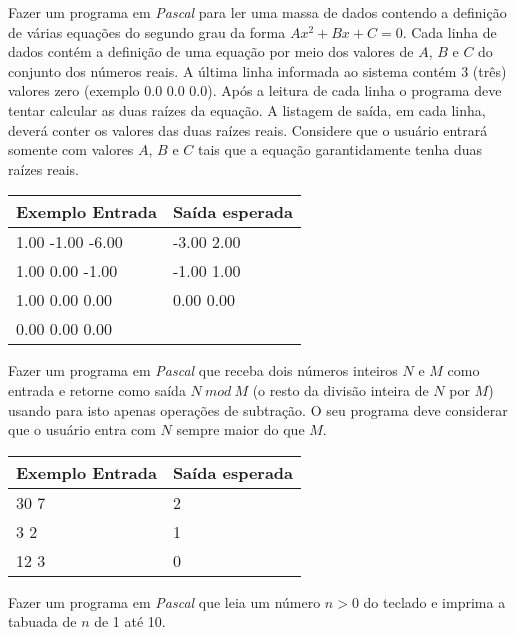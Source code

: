 \item Fazer um programa em \emph{Pascal} para
    ler  uma massa de  dados contendo a  definição de várias  equações do
    segundo grau da forma $Ax^{2} + Bx + C = 0$. Cada linha de dados contém a
    definição de uma equação por meio dos valores de $A$, $B$ e $C$ do conjunto
    dos  números reais.  A última  linha  informada ao  sistema contém  3
    (três) valores  zero (exemplo  0.0 0.0 0.0).  Após a leitura  de cada
    linha o  programa deve tentar calcular  as duas raízes  da equação. A
    listagem de saída, em cada  linha, deverá conter
    os valores das duas raízes reais. Considere
    que o usuário entrará somente com valores $A$, $B$ e $C$ tais que a equação
    garantidamente tenha duas raízes reais. 

\begin{center}
\begin{tabular}{|l|l|} \hline
Exemplo Entrada & Saída esperada \\ \hline
1.00 -1.00 -6.00 & -3.00 2.00 \\
1.00 0.00 -1.00  & -1.00 1.00 \\
1.00 0.00 0.00   & 0.00 0.00  \\ 
0.00 0.00 0.00   &            \\ \hline
\end{tabular}
\end{center}

\item Fazer um programa em \emph{Pascal} que receba dois números inteiros $N$ e
  $M$ como entrada e retorne como saída $N \ mod \ M$ (o resto da
  divisão inteira de $N$ por $M$) usando para isto apenas
  operações de subtração. O seu programa
  deve considerar que o usuário entra com $N$ sempre maior do que $M$.

\begin{center}
\begin{tabular}{|l|l|} \hline
Exemplo Entrada & Saída esperada \\ \hline
30 7            & 2              \\ \hline
3 2             & 1              \\ \hline
12 3            & 0              \\ \hline
\end{tabular}
\end{center}

\item Fazer um programa em \emph{Pascal} que leia um número $n > 0$ do
teclado e imprima a tabuada de $n$ de 1 até 10.

